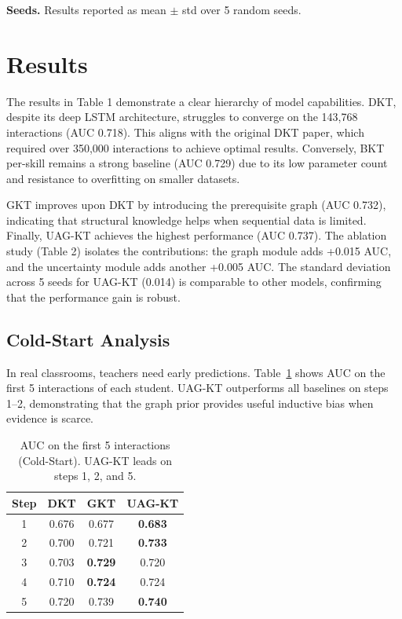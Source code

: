 \documentclass[11pt]{article}
\begin{document}
\textbf{Seeds.} Results reported as mean $\pm$ std over 5 random seeds.

\section{Results}



The results in Table 1 demonstrate a clear hierarchy of model capabilities. DKT, despite its deep LSTM architecture, struggles to converge on the 143,768 interactions (AUC 0.718). This aligns with the original DKT paper, which required over 350,000 interactions to achieve optimal results. Conversely, BKT per-skill remains a strong baseline (AUC 0.729) due to its low parameter count and resistance to overfitting on smaller datasets. 

GKT improves upon DKT by introducing the prerequisite graph (AUC 0.732), indicating that structural knowledge helps when sequential data is limited. Finally, UAG-KT achieves the highest performance (AUC 0.737). The ablation study (Table 2) isolates the contributions: the graph module adds +0.015 AUC, and the uncertainty module adds another +0.005 AUC. The standard deviation across 5 seeds for UAG-KT (0.014) is comparable to other models, confirming that the performance gain is robust.

\subsection{Cold-Start Analysis}
In real classrooms, teachers need early predictions. Table~\ref{tab:coldstart} shows AUC on the first 5 interactions of each student. UAG-KT outperforms all baselines on steps 1--2, demonstrating that the graph prior provides useful inductive bias when evidence is scarce.

\begin{table}[h]
\centering
\caption{AUC on the first 5 interactions (Cold-Start). UAG-KT leads on steps 1, 2, and 5.}
\label{tab:coldstart}
\begin{tabular}{c|ccc}
\toprule
\textbf{Step} & \textbf{DKT} & \textbf{GKT} & \textbf{UAG-KT} \\
\midrule
1 & 0.676 & 0.677 & \textbf{0.683} \\
2 & 0.700 & 0.721 & \textbf{0.733} \\
3 & 0.703 & \textbf{0.729} & 0.720 \\
4 & 0.710 & \textbf{0.724} & 0.724 \\
5 & 0.720 & 0.739 & \textbf{0.740} \\
\bottomrule
\end{tabular}
\end{table}
\end{document}
